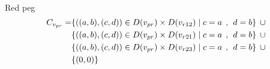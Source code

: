\\ Red peg 
\begin{align*}
C_{v_{pr}} = &\{((a,b),(c,d))\in D(v_{pr}) \times D(v_{r12})\mid c = a \hspace{1ex} , \hspace{1ex}  d = b\} \hspace{1ex} \cup 
\\&\{((a,b),(c,d))\in D(v_{pr}) \times D(v_{r21})\mid c = a \hspace{1ex} , \hspace{1ex}  d = b\} \hspace{1ex} \cup 
\\&\{ ((a,b),(c,d))\in D(v_{pr}) \times D(v_{r23})\mid c = a \hspace{1ex} , \hspace{1ex}  d = b\}\hspace{1ex} \cup 
\\& \{(0,0)\}
\end{align*}
